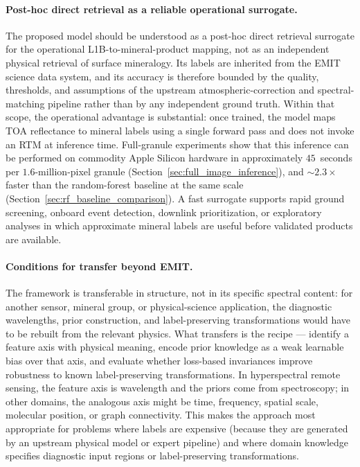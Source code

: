 \documentclass[preprint,12pt]{elsarticle}
\begin{document}
\paragraph{Post-hoc direct retrieval as a reliable operational surrogate.}
The proposed model should be understood as a post-hoc direct retrieval surrogate for the operational L1B-to-mineral-product mapping, not as an independent physical retrieval of surface mineralogy.
Its labels are inherited from the EMIT science data system, and its accuracy is therefore bounded by the quality, thresholds, and assumptions of the upstream atmospheric-correction and spectral-matching pipeline rather than by any independent ground truth.
Within that scope, the operational advantage is substantial: once trained, the model maps TOA reflectance to mineral labels using a single forward pass and does not invoke an RTM at inference time.
Full-granule experiments show that this inference can be performed on commodity Apple Silicon hardware in approximately $45$~seconds per $1.6$-million-pixel granule (Section~\ref{sec:full_image_inference}), and $\sim$$2.3\times$ faster than the random-forest baseline at the same scale (Section~\ref{sec:rf_baseline_comparison}).
A fast surrogate supports rapid ground screening, onboard event detection, downlink prioritization, or exploratory analyses in which approximate mineral labels are useful before validated products are available.

\paragraph{Conditions for transfer beyond EMIT.}
The framework is transferable in structure, not in its specific spectral content: for another sensor, mineral group, or physical-science application, the diagnostic wavelengths, prior construction, and label-preserving transformations would have to be rebuilt from the relevant physics.
What transfers is the recipe --- identify a feature axis with physical meaning, encode prior knowledge as a weak learnable bias over that axis, and evaluate whether loss-based invariances improve robustness to known label-preserving transformations.
In hyperspectral remote sensing, the feature axis is wavelength and the priors come from spectroscopy; in other domains, the analogous axis might be time, frequency, spatial scale, molecular position, or graph connectivity.
This makes the approach most appropriate for problems where labels are expensive (because they are generated by an upstream physical model or expert pipeline) and where domain knowledge specifies diagnostic input regions or label-preserving transformations.
\end{document}
